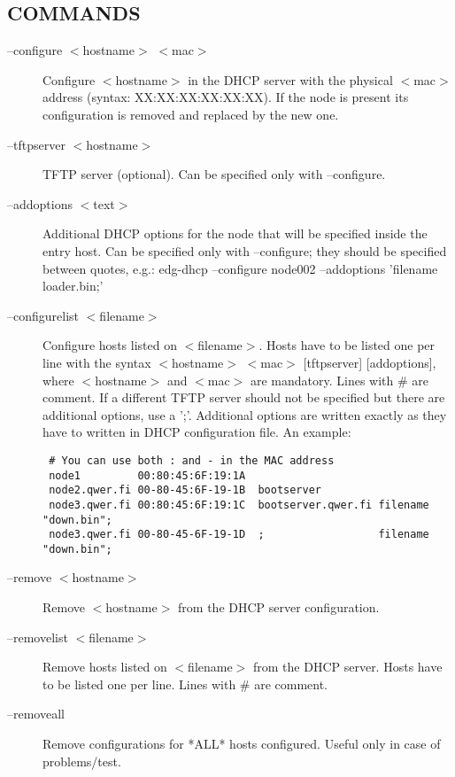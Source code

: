 \subsection*{COMMANDS\label{edg-dhcp_COMMANDS}}
\begin{description}

\item[--configure $<$hostname$>$ $<$mac$>$] \mbox{}

Configure $<$hostname$>$ in the DHCP server with the physical $<$mac$>$ address
(syntax: XX:XX:XX:XX:XX:XX). If the node is present its
configuration is removed and  replaced by the new one.


\item[--tftpserver $<$hostname$>$] \mbox{}

TFTP server (optional). Can be specified only with --configure.


\item[--addoptions $<$text$>$] \mbox{}

Additional DHCP options for the node that will be specified
inside the entry host. Can be specified only with --configure;
they should be specified between quotes, e.g.:
 edg-dhcp --configure node002 --addoptions 'filename loader.bin;'


\item[--configurelist $<$filename$>$] \mbox{}

Configure hosts listed on $<$filename$>$. Hosts have to be listed one per line
with the syntax $<$hostname$>$ $<$mac$>$ [tftpserver] [addoptions], where $<$hostname$>$
and $<$mac$>$ are mandatory. Lines with \# are comment. If a different TFTP server
should not be specified but there are additional options, use a ';'.
Additional options are written exactly as they have to written in DHCP
configuration file. An example:

\begin{verbatim}
 # You can use both : and - in the MAC address
 node1         00:80:45:6F:19:1A
 node2.qwer.fi 00-80-45:6F-19-1B  bootserver
 node3.qwer.fi 00:80:45:6F:19:1C  bootserver.qwer.fi filename "down.bin";
 node3.qwer.fi 00-80-45-6F-19-1D  ;                  filename "down.bin";
\end{verbatim}

\item[--remove $<$hostname$>$] \mbox{}

Remove $<$hostname$>$ from the DHCP server configuration.


\item[--removelist $<$filename$>$] \mbox{}

Remove hosts listed on $<$filename$>$ from the DHCP server. Hosts have to
be listed one per line. Lines with \# are comment.


\item[--removeall] \mbox{}

Remove configurations for *ALL* hosts configured. Useful only in case
of problems/test.

\end{description}
